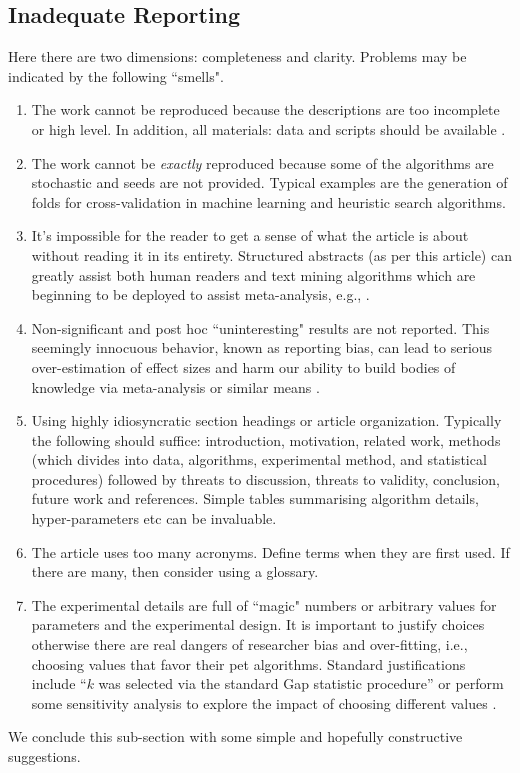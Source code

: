 \documentclass[preprint,10pt]{elsarticle}
\begin{document}
\subsection{Inadequate Reporting}\label{sect:report}

Here there are two dimensions: completeness and clarity. Problems may be indicated by the following ``smells".

\begin{enumerate}
\item The work cannot be reproduced because the descriptions are too incomplete or high level.  In addition, all materials: data and scripts should be available \cite{Good16,Muna17}.
\item The work cannot be \textit{exactly} reproduced because some of the algorithms are stochastic and seeds are not provided.  Typical examples are the generation of folds for cross-validation in machine learning and heuristic search algorithms.
\item It's impossible for the reader to get a sense of what the article is about without reading it in its entirety. Structured abstracts (as per this article) can greatly assist both human readers \cite{Budg11} and text mining algorithms which are beginning to be deployed to assist meta-analysis, e.g., \cite{Szuc17}.
\item Non-significant and post hoc ``uninteresting" results are not reported. This seemingly innocuous behavior, known as reporting bias, can lead to serious over-estimation of effect sizes and harm our ability to build bodies of knowledge via meta-analysis or similar means \cite{Good16,Szuc17}.
\item Using highly idiosyncratic section headings or article organization.  Typically the following should suffice: introduction, motivation, related work, methods (which divides into data, algorithms, experimental method, and statistical procedures) followed by threats to discussion, threats to validity, conclusion, future work and references.  Simple tables summarising algorithm details, hyper-parameters etc can be invaluable. %
\item The article uses too many acronyms.  Define terms when they are first used.  If there are many, then consider using a glossary.  %
\item The experimental details are full of ``magic" numbers or arbitrary values for parameters and the experimental design. It is important to justify choices otherwise there are real dangers of researcher bias and over-fitting, i.e., choosing values that favor their pet algorithms.  Standard justifications include ``$k$ was selected via the standard Gap statistic procedure'' or perform some sensitivity analysis to explore the impact of choosing different values \cite{Salt00}.
\end{enumerate}
We conclude this sub-section with some simple and hopefully constructive suggestions.
\end{document}

